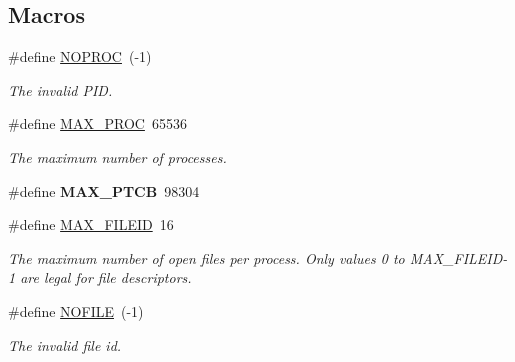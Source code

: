 \subsection*{Macros}
\begin{DoxyCompactItemize}
\item 
\mbox{\label{group__syscalls_gaf22d54bd4d558803b5ccbc6eb21f83b2}} 
\#define \hyperlink{group__syscalls_gaf22d54bd4d558803b5ccbc6eb21f83b2}{N\+O\+P\+R\+OC}~(-\/1)
\begin{DoxyCompactList}\small\item\em The invalid P\+ID. \end{DoxyCompactList}\item 
\mbox{\label{group__syscalls_ga63e32d00bc48471b4db49d481ac228dc}} 
\#define \hyperlink{group__syscalls_ga63e32d00bc48471b4db49d481ac228dc}{M\+A\+X\+\_\+\+P\+R\+OC}~65536
\begin{DoxyCompactList}\small\item\em The maximum number of processes. \end{DoxyCompactList}\item 
\mbox{\label{group__syscalls_ga23b7360345dee24faba286283f47e218}} 
\#define {\bfseries M\+A\+X\+\_\+\+P\+T\+CB}~98304
\item 
\mbox{\label{group__syscalls_ga9c697bf9e856897ad75f28190a6f0b68}} 
\#define \hyperlink{group__syscalls_ga9c697bf9e856897ad75f28190a6f0b68}{M\+A\+X\+\_\+\+F\+I\+L\+E\+ID}~16
\begin{DoxyCompactList}\small\item\em The maximum number of open files per process. Only values 0 to M\+A\+X\+\_\+\+F\+I\+L\+E\+I\+D-\/1 are legal for file descriptors. \end{DoxyCompactList}\item 
\mbox{\label{group__syscalls_ga80bacbaea8dd6aecf216d85d981bcb21}} 
\#define \hyperlink{group__syscalls_ga80bacbaea8dd6aecf216d85d981bcb21}{N\+O\+F\+I\+LE}~(-\/1)
\begin{DoxyCompactList}\small\item\em The invalid file id. \end{DoxyCompactList}\item 
\mbox{\label{group__syscalls_ga00ccfb785dd0b09ec7091fc213c2f491}} 

\end{DoxyCompactItemize}
